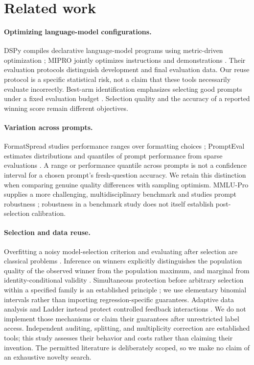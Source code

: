 \section{Related work}
\paragraph{Optimizing language-model configurations.}
DSPy compiles declarative language-model programs using metric-driven optimization \citep{khattab2023dspy}; MIPRO jointly optimizes instructions and demonstrations \citep{opsahlong2024mipro}. Their evaluation protocols distinguish development and final evaluation data. Our reuse protocol is a specific statistical risk, not a claim that these tools necessarily evaluate incorrectly. Best-arm identification emphasizes selecting good prompts under a fixed evaluation budget \citep{shi2024bestarm}. Selection quality and the accuracy of a reported winning score remain different objectives.

\paragraph{Variation across prompts.}
FormatSpread studies performance ranges over formatting choices \citep{sclar2023formats}; PromptEval estimates distributions and quantiles of prompt performance from sparse evaluations \citep{polo2024multiprompt}. A range or performance quantile across prompts is not a confidence interval for a chosen prompt's fresh-question accuracy. We retain this distinction when comparing genuine quality differences with sampling optimism. MMLU-Pro supplies a more challenging, multidisciplinary benchmark and studies prompt robustness \citep{wang2024mmlupro}; robustness in a benchmark study does not itself establish post-selection calibration.

\paragraph{Selection and data reuse.}
Overfitting a noisy model-selection criterion and evaluating after selection are classical problems \citep{cawleytalbot2010selection}. Inference on winners explicitly distinguishes the population quality of the observed winner from the population maximum, and marginal from identity-conditional validity \citep{andrews2021winners}. Simultaneous protection before arbitrary selection within a specified family is an established principle \citep{berk2013posi}; we use elementary binomial intervals rather than importing regression-specific guarantees. Adaptive data analysis and Ladder instead protect controlled feedback interactions \citep{dwork2014adaptive,blumhardt2015ladder}. We do not implement those mechanisms or claim their guarantees after unrestricted label access. Independent auditing, splitting, and multiplicity correction are established tools; this study assesses their behavior and costs rather than claiming their invention. The permitted literature is deliberately scoped, so we make no claim of an exhaustive novelty search.
